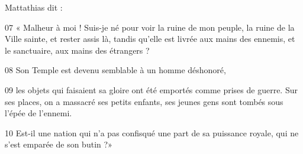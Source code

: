 
Mattathias dit :

07 « Malheur à moi ! Suis-je né pour voir la ruine de mon peuple, la ruine de la Ville sainte, et rester assis là, tandis qu’elle est livrée aux mains des ennemis, et le sanctuaire, aux mains des étrangers ?

08 Son Temple est devenu semblable à un homme déshonoré,

09 les objets qui faisaient sa gloire ont été emportés comme prises de guerre. Sur ses places, on a massacré ses petits enfants, ses jeunes gens sont tombés sous l’épée de l’ennemi.

10 Est-il une nation qui n’a pas confisqué une part de sa puissance royale, qui ne s’est emparée de son butin ?»
